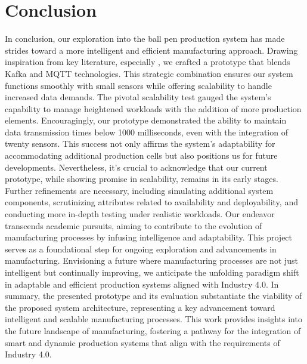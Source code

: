 \section{Conclusion}

In conclusion, our exploration into the ball pen production system has made strides toward a more intelligent and efficient manufacturing approach. Drawing inspiration from key literature, especially \cite{Liu2022}, we crafted a prototype that blends Kafka and MQTT technologies. This strategic combination ensures our system functions smoothly with small sensors while offering scalability to handle increased data demands.
The pivotal scalability test gauged the system's capability to manage heightened workloads with the addition of more production elements. Encouragingly, our prototype demonstrated the ability to maintain data transmission times below 1000 milliseconds, even with the integration of twenty sensors. This success not only affirms the system's adaptability for accommodating additional production cells but also positions us for future developments.
Nevertheless, it's crucial to acknowledge that our current prototype, while showing promise in scalability, remains in its early stages. Further refinements are necessary, including simulating additional system components, scrutinizing attributes related to availability and deployability, and conducting more in-depth testing under realistic workloads.
Our endeavor transcends academic pursuits, aiming to contribute to the evolution of manufacturing processes by infusing intelligence and adaptability. This project serves as a foundational step for ongoing exploration and advancements in manufacturing. Envisioning a future where manufacturing processes are not just intelligent but continually improving, we anticipate the unfolding paradigm shift in adaptable and efficient production systems aligned with Industry 4.0.
In summary, the presented prototype and its evaluation substantiate the viability of the proposed system architecture, representing a key advancement toward intelligent and scalable manufacturing processes. This work provides insights into the future landscape of manufacturing, fostering a pathway for the integration of smart and dynamic production systems that align with the requirements of Industry 4.0.
\cite{Liu2022}